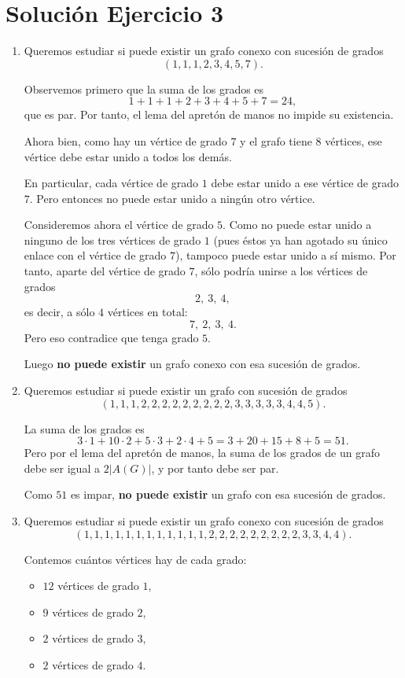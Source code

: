 \documentclass[12pt]{article}
\begin{document}
\section*{Solución Ejercicio 3}

\begin{enumerate}
    \item Queremos estudiar si puede existir un grafo conexo con sucesión de grados
    \[
    (1,1,1,2,3,4,5,7).
    \]

    Observemos primero que la suma de los grados es
    \[
    1+1+1+2+3+4+5+7=24,
    \]
    que es par. Por tanto, el lema del apretón de manos no impide su existencia.

    Ahora bien, como hay un vértice de grado $7$ y el grafo tiene $8$ vértices, ese vértice debe estar unido a todos los demás.

    En particular, cada vértice de grado $1$ debe estar unido a ese vértice de grado $7$. Pero entonces no puede estar unido a ningún otro vértice.

    Consideremos ahora el vértice de grado $5$. Como no puede estar unido a ninguno de los tres vértices de grado $1$ (pues éstos ya han agotado su único enlace con el vértice de grado $7$), tampoco puede estar unido a sí mismo. Por tanto, aparte del vértice de grado $7$, sólo podría unirse a los vértices de grados
    \[
    2,\ 3,\ 4,
    \]
    es decir, a sólo $4$ vértices en total:
    \[
    7,\ 2,\ 3,\ 4.
    \]
    Pero eso contradice que tenga grado $5$.

    Luego \textbf{no puede existir} un grafo conexo con esa sucesión de grados.

    \item Queremos estudiar si puede existir un grafo con sucesión de grados
    \[
    (1,1,1,2,2,2,2,2,2,2,2,2,3,3,3,3,3,4,4,5).
    \]

    La suma de los grados es
    \[
    3\cdot 1+10\cdot 2+5\cdot 3+2\cdot 4+5
    =3+20+15+8+5=51.
    \]
    Pero por el lema del apretón de manos, la suma de los grados de un grafo debe ser igual a $2|A(G)|$, y por tanto debe ser par.

    Como $51$ es impar, \textbf{no puede existir} un grafo con esa sucesión de grados.

    \item Queremos estudiar si puede existir un grafo conexo con sucesión de grados
    \[
    (1,1,1,1,1,1,1,1,1,1,1,1,2,2,2,2,2,2,2,2,2,3,3,4,4).
    \]

    Contemos cuántos vértices hay de cada grado:
    \begin{itemize}
        \item $12$ vértices de grado $1$,
        \item $9$ vértices de grado $2$,
        \item $2$ vértices de grado $3$,
        \item $2$ vértices de grado $4$.
    \end{itemize}


\end{enumerate}
\end{document}

